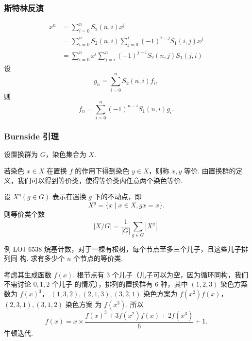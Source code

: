 \subsubsection{斯特林反演}
\begin{equation*}
    \begin{aligned}
        x^n &= \sum_{i=0}^n S_2(n, i) x^{\underline{i}} \\
        &= \sum_{i=0}^n S_2(n, i) \sum_{j=0}^i (-1)^{i-j} S_1(i, j) x^j \\
        &= \sum_{i=0}^n x^i \sum_{j=i}^n (-1)^{j-i} S_2(n, j) S_1(j, i)
    \end{aligned}
\end{equation*}
\noindent 设
\begin{equation*}
    g_n = \sum_{i=0}^n S_2(n, i) f_i,
\end{equation*}
\noindent 则
\begin{equation*}
    f_n = \sum_{i=0}^n (-1)^{n-i} S_1(n, i) g_i.
\end{equation*}

\subsubsection{Burnside 引理}
设置换群为 $G$，染色集合为 $X$.

若染色 $x \in X$ 在置换 $f$ 的作用下得到染色 $y \in X$，则称 $x, y$ 等价.
由置换群的定义，我们可以得到等价类，使得等价类内任意两个染色等价.

设 $X^g (g \in G)$ 表示在置换 $g$ 下的不动点，即
$$
X^g = \{x \mid x \in X, gx = x\}.
$$
则等价类个数
$$
|X / G| = \frac{1}{|G|} \sum_{g \in G} |X^g|.
$$

例 LOJ 6538 烷基计数，对于一棵有根树，每个节点至多三个儿子，且这些儿子排列同
构. 求有多少个 $n$ 个节点的等价类.

考虑其生成函数 $f(x)$.
根节点有 $3$ 个儿子（儿子可以为空，因为循环同构，我们不需讨论 $0, 1, 2$ 个儿子
的情况），排列的置换群有 $6$ 种，其中 $(1,2,3)$ 染色方案数为 $f(x)^3$，
$(1,3,2),(2,1,3),(3,2,1)$ 染色方案为 $f(x^2)f(x)$，$(2,3,1),(3,1,2)$ 染色方案
为 $f(x^3)$. 所以
$$
f(x) = x \times \frac{f(x)^3+3f(x^2)f(x)+2f(x^3)}{6}+1.
$$
牛顿迭代.
